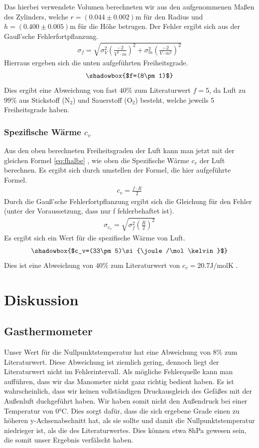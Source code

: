 \documentclass[12pt,a4paper,titlepage,headinclude,bibtotoc]{scrartcl}
\begin{document}
Das hierbei verwendete Volumen berechneten wir aus den aufgenommenen Maßen des Zylinders, welche $r=(0.044\pm 0.002)$m für den Radius und $h=(0.400\pm 0.005)$m für die Höhe betrugen.
Der Fehler ergibt sich aus der Gauß'sche Fehlerfortpflanzung.
\begin{align}
	\sigma_f=\sqrt{\sigma_V^2\left(\frac{-2}{V^2\cdot m}\right)^2+\sigma_m^2\left(\frac{-2}{V\cdot m^2}\right)^2}
\end{align}
Hierraus ergeben sich die unten aufgeführten Freiheitsgrade.
$$\shadowbox{$f=(8\pm 1)$}$$
Dies ergibt eine Abweichung von fast $40\%$ zum Literaturwert $f=5$, da Luft zu $99\%$ aus Stickstoff (N$_2$) und Sauerstoff (O$_2$) besteht, welche jeweils 5 Freiheitsgrade haben.

\subsubsection{Spezifische Wärme $c_v$}
Aus den oben berechneten Freiheitsgraden der Luft kann man jetzt mit der gleichen Formel \eqref{eq:fhalbe}
, wie oben die Spezifische Wärme $c_v$ der Luft berechnen.
Es ergibt sich durch umstellen der Formel, die hier aufgeführte Formel.
\begin{align}
	c_v=\frac{f\cdot R}{2}
\end{align}
Durch die Gauß'sche Fehlerfortpflanzung ergibt sich die Gleichung für den Fehler (unter der Voraussetzung, dass nur f fehlerbehaftet ist).
\begin{align}
	\sigma_{c_v}= \sqrt{\sigma_f^2\left(\frac{R}{2}\right)^2}
\end{align}
Es ergibt sich ein Wert für die spezifische Wärme von Luft.
$$\shadowbox{$c_v=(33\pm 5)\si{\joule/\mol\kelvin}$}$$
Dies ist eine Abweichung von $40\%$
zum Literaturwert von $c_v=20.7\si{\joule/\mol\kelvin}$ \cite[S. 260]{gerthsen}.

\section{Diskussion}
\label{sec:diskussion}
\subsection{Gasthermometer}
Unser Wert für die Nullpunktstemperatur hat eine Abweichung von 8\% zum Literaturwert.
Diese Abweichung ist ziemlich gering, dennoch liegt der Literaturwert nicht im Fehlerintervall.
Als mögliche Fehlerquelle kann man aufführen, dass wir das Manometer nicht ganz richtig bedient haben.
Es ist wahrscheinlich, dass wir keinen vollständigen Druckausgleich des Gefäßes mit der Außenluft duchgeführt haben.
Wir haben somit nicht den Außendruck bei einer Temperatur von 0\si{\celsius}.
Dies sorgt dafür, dass die sich ergebene Grade einen zu höheren y-Achsenabschnitt hat, als sie sollte und damit die Nullpunktstemperatur niedrieger ist, als die des Literaturwertes.
Dies können etwa 8hPa gewesen sein, die somit unser Ergebnis verfälscht haben.
\end{document}
